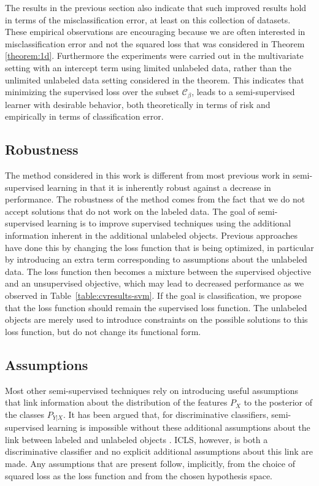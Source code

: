 \documentclass[twoside]{memoir}\usepackage[]{graphicx}\usepackage{xcolor}
\newcommand{\Cb}{\mathcal{C}_{\beta}}
\begin{document}
The results in the previous section also indicate that such improved results hold in terms of the misclassification error, at least on this collection of datasets. These empirical observations are encouraging because we are often interested in misclassification error and not the squared loss that was considered in Theorem \ref{theorem:1d}. Furthermore the experiments were carried out in the multivariate setting with an intercept term using limited unlabeled data, rather than the unlimited unlabeled data setting considered in the theorem. This indicates that minimizing the supervised loss over the subset $\Cb$, leads to a semi-supervised learner with desirable behavior, both theoretically in terms of risk and empirically in terms of classification error.

\subsection*{Robustness}
The method considered in this work is different from most previous work in semi-supervised learning in that it is inherently robust against a decrease in performance. 
The robustness of the method comes from the fact that we do not accept solutions that do not work on the labeled data. The goal of semi-supervised learning is to improve supervised techniques using the additional information inherent in the additional unlabeled objects. Previous approaches have done this by changing the loss function that is being optimized, in particular by introducing an extra term corresponding to assumptions about the unlabeled data. The loss function then becomes a mixture between the supervised objective and an unsupervised objective, which may lead to decreased performance as we observed in Table~\ref{table:cvresults-svm}. If the goal is classification, we propose that the loss function should remain the supervised loss function. The unlabeled objects are merely used to introduce constraints on the possible solutions to this loss function, but do not change its functional form.

\subsection*{Assumptions}
Most other semi-supervised techniques rely on introducing useful assumptions that link information about the distribution of the features $P_X$ to the posterior of the classes $P_{Y|X}$. It has been argued that, for discriminative classifiers, semi-supervised learning is impossible without these additional assumptions about the link between labeled and unlabeled objects \citep{Seeger2001,Singh2008}. ICLS, however, is both a discriminative classifier and no explicit additional assumptions about this link are made.  Any assumptions that are present follow, implicitly, from the choice of squared loss as the loss function and from the chosen hypothesis space.
\end{document}
